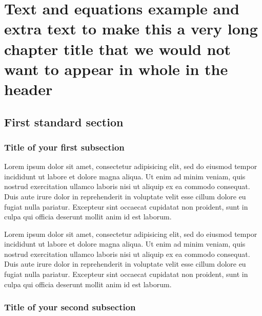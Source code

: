 \chapter[Text and equations example]{Text and equations example and extra text
to make this a very long chapter title that we would not want to appear in
whole in the header}

\section{First standard section}

\subsection{Title of your first subsection}

Lorem ipsum dolor sit amet, consectetur adipisicing elit, sed do eiusmod tempor
incididunt ut labore et dolore magna aliqua. Ut enim ad minim veniam, quis
nostrud exercitation ullamco laboris nisi ut aliquip ex ea commodo consequat.
Duis aute irure dolor in reprehenderit in voluptate velit esse cillum dolore eu
fugiat nulla pariatur. Excepteur sint occaecat cupidatat non proident, sunt in
culpa qui officia deserunt mollit anim id est laborum.

Lorem ipsum dolor sit amet, consectetur adipisicing elit, sed do eiusmod tempor
incididunt ut labore et dolore magna aliqua. Ut enim ad minim veniam, quis
nostrud exercitation ullamco laboris nisi ut aliquip ex ea commodo consequat.
Duis aute irure dolor in reprehenderit in voluptate velit esse cillum dolore eu
fugiat nulla pariatur. Excepteur sint occaecat cupidatat non proident, sunt in
culpa qui officia deserunt mollit anim id est laborum.

\subsection{Title of your second subsection}

